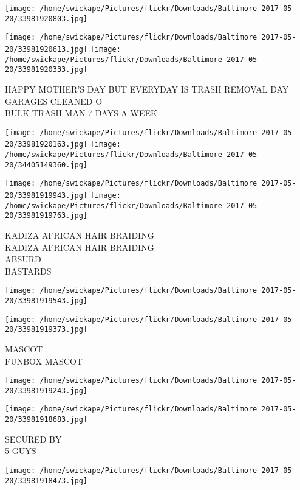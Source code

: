 \documentclass[10pt,letterpaper]{article}
\begin{document}
\texttt{[image: /home/swickape/Pictures/flickr/Downloads/Baltimore 2017-05-20/33981920803.jpg]}

\vspace{0.25in}
\texttt{[image: /home/swickape/Pictures/flickr/Downloads/Baltimore 2017-05-20/33981920613.jpg]}
\texttt{[image: /home/swickape/Pictures/flickr/Downloads/Baltimore 2017-05-20/33981920333.jpg]}

HAPPY MOTHER'S DAY BUT EVERYDAY IS TRASH REMOVAL DAY\\
GARAGES CLEANED O\\
BULK TRASH MAN 7 DAYS A WEEK
\pagebreak

\texttt{[image: /home/swickape/Pictures/flickr/Downloads/Baltimore 2017-05-20/33981920163.jpg]}
\texttt{[image: /home/swickape/Pictures/flickr/Downloads/Baltimore 2017-05-20/34405149360.jpg]}

\texttt{[image: /home/swickape/Pictures/flickr/Downloads/Baltimore 2017-05-20/33981919943.jpg]}
\texttt{[image: /home/swickape/Pictures/flickr/Downloads/Baltimore 2017-05-20/33981919763.jpg]}

KADIZA AFRICAN HAIR BRAIDING\\
KADIZA AFRICAN HAIR BRAIDING\\
ABSURD\\
BASTARDS
\pagebreak

\texttt{[image: /home/swickape/Pictures/flickr/Downloads/Baltimore 2017-05-20/33981919543.jpg]}

\vspace{0.25in}
\texttt{[image: /home/swickape/Pictures/flickr/Downloads/Baltimore 2017-05-20/33981919373.jpg]}

MASCOT\\
FUNBOX MASCOT
\pagebreak

\texttt{[image: /home/swickape/Pictures/flickr/Downloads/Baltimore 2017-05-20/33981919243.jpg]}

\vspace{0.25in}
\texttt{[image: /home/swickape/Pictures/flickr/Downloads/Baltimore 2017-05-20/33981918683.jpg]}

SECURED BY\\
5 GUYS
\pagebreak

\texttt{[image: /home/swickape/Pictures/flickr/Downloads/Baltimore 2017-05-20/33981918473.jpg]}
\end{document}
